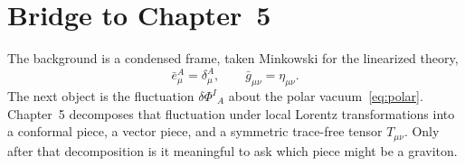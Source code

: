 \section{Bridge to Chapter~5}
\label{sec:ch4-bridge}

The background is a condensed frame, taken Minkowski for the
linearized theory,
\begin{equation}
  \label{eq:bg-next}
  \bar e^A_\mu=\delta^A_\mu,
  \qquad
  \bar g_{\mu\nu}=\eta_{\mu\nu}.
\end{equation}
The next object is the fluctuation \(\delta\Phi^I{}_A\) about the
polar vacuum~\eqref{eq:polar}. Chapter~5 decomposes that fluctuation
under local Lorentz transformations into a conformal piece, a vector
piece, and a symmetric trace-free tensor \(T_{\mu\nu}\). Only after
that decomposition is it meaningful to ask which piece might be a
graviton.